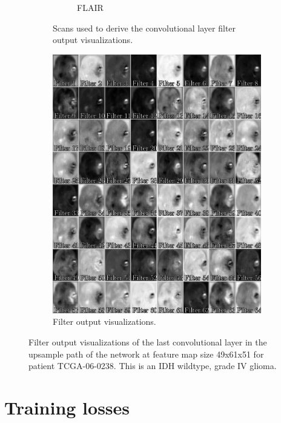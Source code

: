 \begin{subappendices}
\begin{figure}
\begin{subfigure}[b]{0.88\textwidth}
\begin{subfigure}[b]{0.24\textwidth}
        \caption*{\acrshort{FLAIR}}
        \end{subfigure}
        \caption{Scans used to derive the convolutional layer filter output visualizations.}
    \end{subfigure}
    \begin{subfigure}[b]{0.9\textwidth}
        \centering
        \includegraphics[width=\textwidth]{Figures/conv_filter_HGG_deep.pdf}
        \caption{Filter output visualizations.}
    \end{subfigure}
    \caption{Filter output visualizations of the last convolutional layer in the upsample path of the network at feature map size 49x61x51 for patient TCGA-06-0238.
     This is an IDH wildtype, grade IV glioma.}\label{fig:filter_hgg_deep}
\end{figure}


\newpage

\section{Training losses}\label{app:losses}


\end{subappendices}
